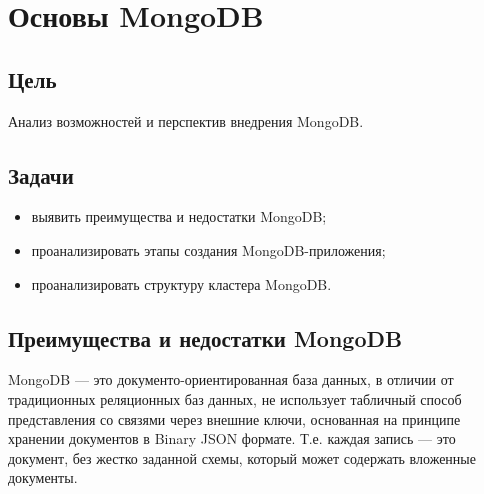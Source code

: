



\newcommand{\labnumber}{4} %



\usepackage{longtable,tabu}

\graphicspath{{figures/}}


\Ukrainian


\addtocounter{page}{1}

\section{Основы MongoDB}
\subsection*{Цель}
Анализ возможностей и перспектив внедрения MongoDB.
\subsection*{Задачи}
\begin{itemize}
	\item выявить преимущества и недостатки MongoDB;
	\item проанализировать этапы создания MongoDB-приложения;
	\item проанализировать структуру кластера MongoDB.
\end{itemize}

\subsection{Преимущества и недостатки MongoDB}
MongoDB --- это документо-ориентированная база данных, в отличии от традиционных реляционных баз данных, не использует табличный способ представления со связями через внешние ключи, основанная на принципе хранении документов в Binary JSON формате. Т.е. каждая запись — это документ, без жестко заданной схемы, который может содержать вложенные документы.

